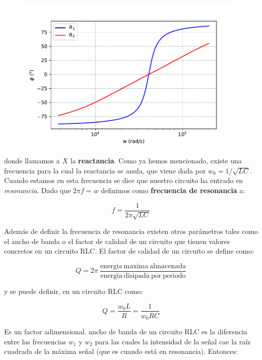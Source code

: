 \documentclass[12pt]{article}
\begin{document}
\begin{figure}[h!] \centering
\includegraphics[scale=0.8]{desfase.pdf}
\end{figure}


donde llamamos a $X$ la \textbf{reactancia}. Como ya hemos mencionado, existe una frecuencia para la cual la reactancia se anula, que viene dada por $w_0 = 1/\sqrt{LC}$. Cuando estamos en esta frecuencia se dice que nuestro circuito ha entrado en \textit{resonancia}. Dado que $2 \pi f = w$ definimos como \textbf{frecuencia de resonancia} a:

\begin{equation}
f = \dfrac{1}{2 \pi \sqrt{LC}}
\end{equation}




Además de definir la frecuencia de resonancia existen otros parámetros tales como el ancho de banda o el factor de calidad de un circuito que tienen valores concretos en un circuito RLC. El factor de calidad de un circuito se define como:

\begin{equation}
Q  = 2 \pi \ \dfrac{\mathrm{energia \ maxima \ almacenada}}{\mathrm{energia \ disipada \ por \ periodo}}
\end{equation}

y se puede definir, en un circuito RLC como:

\begin{equation}
Q = \dfrac{w_0 L}{R} = \dfrac{1}{w_0 RC}
\end{equation}

Es un factor adimensional. ancho de banda de un circuito RLC es la diferencia entre las frecuencias $w_1$ y $w_2$ para las cuales la intensidad de la señal cae la raíz cuadrada de la máxima señal (que es cuando está en resonancia). Entonces:
\end{document}
